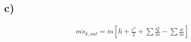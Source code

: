

\subsection*{c)}

\begin{align*}
    m \dot{s}_{k, out} = \dot{m} \left[ h + \frac{c^2}{2} + \sum \frac{Q}{\dot{m}} - \sum \frac{w}{\dot{m}} \right]
\end{align*}